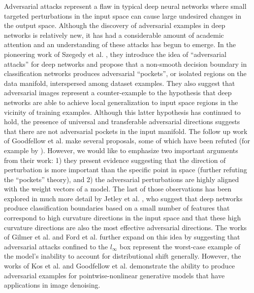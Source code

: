 Adversarial attacks represent a flaw in typical deep neural networks where small targeted perturbations in the input space can cause large undesired changes in the output space.
Although the discovery of adversarial examples in deep networks is relatively new, it has had a considerable amount of academic attention and an understanding of these attacks has begun to emerge.
In the pioneering work of Szegedy et al. \citeyearpar{szegedy2013intriguing}, they introduce the idea of ``adversarial attacks'' for deep networks and propose that a non-smooth decision boundary in classification networks produces adversarial ``pockets'', or isolated regions on the data manifold, interspersed among dataset examples.
They also suggest that adversarial images represent a counter-example to the hypothesis that deep networks are able to achieve local generalization to input space regions in the vicinity of training examples.
Although this latter hypothesis has continued to hold, the presence of universal and transferable adversarial directions \parencite{moosavi2017universal} suggests that there are not adversarial pockets in the input manifold.
The follow up work of Goodfellow et al. \citeyearpar{goodfellow2014explaining} make several proposals, some of which have been refuted (for example by \cite{jetley2018friends}).
However, we would like to emphasize two important arguments from their work: 1) they present evidence suggesting that the direction of perturbation is more important than the specific point in space (further refuting the ``pockets'' theory), and 2) the adversarial perturbations are highly aligned with the weight vectors of a model.
The last of those observations has been explored in much more detail by Jetley et al. \citeyearpar{jetley2018friends}, who suggest that deep networks produce classification boundaries based on a small number of features that correspond to high curvature directions in the input space and that these high curvature directions are also the most effective adversarial directions.
The works of Gilmer et al. \citeyearpar{gilmer2018adversarial} and Ford et al. \citeyearpar{ford2019adversarial} further expand on this idea by suggesting that adversarial attacks confined to the $l_{\infty}$ box represent the worst-case example of the model's inability to account for distributional shift generally.
However, the works of Kos et al. \citeyearpar{kos2018adversarial} and Goodfellow et al. \citeyearpar{goodfellow2014explaining} demonstrate the ability to produce adversarial examples for pointwise-nonlinear generative models that have applications in image denoising.
